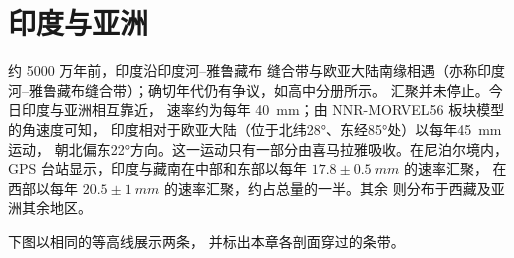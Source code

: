 \section{印度与亚洲}\label{sec:b2:himalaya-andes:himalaya}

约 5000 万年前，印度沿印度河–雅鲁藏布
缝合带与欧亚大陆南缘相遇（亦称印度河–雅鲁藏布缝合带）；确切年代仍有争议，如高中分册所示。
汇聚并未停止。今日印度与亚洲相互靠近，
速率约为每年 \qty{40}{mm}；由 NNR-MORVEL56 板块模型的角速度可知，
印度相对于欧亚大陆（位于北纬\ang{28}、东经\ang{85}处）以每年\qty{45}{mm}运动，
朝北偏东\ang{22}方向。这一运动只有一部分由喜马拉雅吸收。在尼泊尔境内，
GPS 台站显示，印度与藏南在中部和东部以每年 $17.8 \pm \qty{0.5}{mm}$ 的速率汇聚，
在西部以每年 $20.5 \pm \qty{1}{mm}$ 的速率汇聚，约占总量的一半。其余
则分布于西藏及亚洲其余地区。

下图以相同的等高线展示两条，
并标出本章各剖面穿过的条带。

